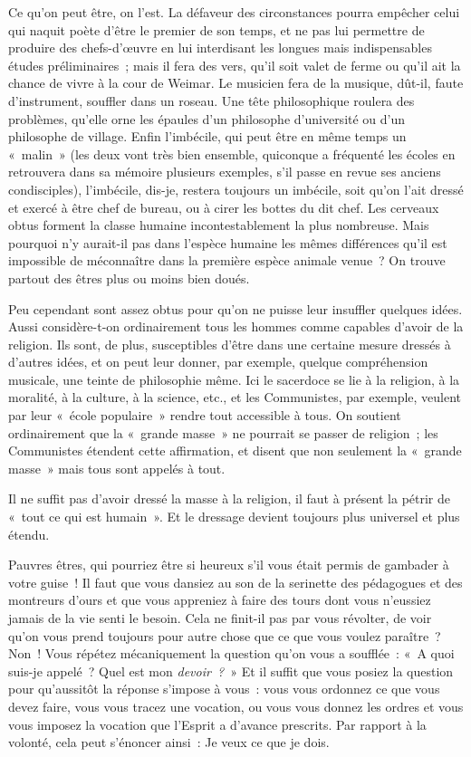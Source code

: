 \documentclass[french,twoside]{book} %
\begin{document}
Ce qu’on peut être, on l’est. La défaveur des circonstances  pourra empêcher celui qui naquit poète d’être le premier de son temps, et ne pas lui permettre de produire des chefs-d’œuvre en lui interdisant les longues mais indispensables études préliminaires ; mais il fera des vers, qu’il soit valet de ferme ou qu’il ait la chance de vivre à la cour de Weimar. Le musicien fera de la musique, dût-il, faute d’instrument, souffler dans un roseau. Une tête philosophique roulera des problèmes, qu’elle orne les épaules d’un philosophe d’université ou d’un philosophe de village. Enfin l’imbécile, qui peut être en même temps un « malin » (les deux vont très bien ensemble, quiconque a fréquenté les écoles en retrouvera dans sa mémoire plusieurs exemples, s’il passe en revue ses anciens condisciples), l’imbécile, dis-je, restera toujours un imbécile, soit qu’on l’ait dressé et exercé à être chef de bureau, ou à cirer les bottes du dit chef. Les cerveaux obtus forment la classe humaine incontestablement la plus nombreuse. Mais pourquoi n’y aurait-il pas dans l’espèce humaine les mêmes différences qu’il est impossible de méconnaître dans la première espèce animale venue ? On trouve partout des êtres plus ou moins bien doués.\par
Peu cependant sont assez obtus pour qu’on ne puisse leur insuffler quelques idées. Aussi considère-t-on ordinairement tous les hommes comme capables d’avoir de la religion. Ils sont, de plus, susceptibles d’être dans une certaine mesure dressés à d’autres idées, et on peut leur donner, par exemple, quelque compréhension musicale, une teinte de philosophie même. Ici le sacerdoce se lie à la religion, à la moralité, à la culture, à la science, etc., et les Communistes, par exemple, veulent par leur « école populaire » rendre tout accessible à tous. On soutient ordinairement que la « grande masse » ne pourrait se passer de religion ; les Communistes étendent cette affirmation, et disent que non seulement la « grande masse » mais tous sont appelés à tout.\par
 Il ne suffit pas d’avoir dressé la masse à la religion, il faut à présent la pétrir de « tout ce qui est humain ». Et le dressage devient toujours plus universel et plus étendu.\par
Pauvres êtres, qui pourriez être si heureux s’il vous était permis de gambader à votre guise ! Il faut que vous dansiez au son de la serinette des pédagogues et des montreurs d’ours et que vous appreniez à faire des tours dont vous n’eussiez jamais de la vie senti le besoin. Cela ne finit-il pas par vous révolter, de voir qu’on vous prend toujours pour autre chose que ce que vous voulez paraître ? Non ! Vous répétez mécaniquement la question qu’on vous a soufflée : « A quoi suis-je appelé ? Quel est mon \emph{devoir ?} » Et il suffit que vous posiez la question pour qu’aussitôt la réponse s’impose à vous : vous vous ordonnez ce que vous devez faire, vous vous tracez une vocation, ou vous vous donnez les ordres et vous vous imposez la vocation que l’Esprit a d’avance prescrits. Par rapport à la volonté, cela peut s’énoncer ainsi : Je veux ce que je dois.\par
\end{document}
